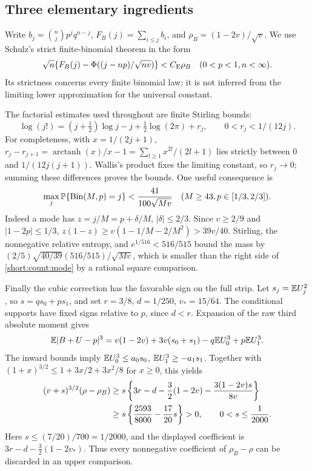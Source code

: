 \subsection{Three elementary ingredients}
\label{short:count:prelim}

Write $b_j=\binom njp^jq^{n-j}$, $F_B(j)=\sum_{i\le j}b_i$, and
$\rho_B=(1-2v)/\sqrt v$. We use Schulz's strict finite-binomial theorem
\cite[Theorem~1]{Schulz2016} in the form
\begin{equation}\label{short:count:binomial}
 \sqrt n\{F_B(j)-\Phi((j-np)/\sqrt{nv})\}<C_{\mathrm E}\rho_B
 \quad(0<p<1, n<\infty).
\end{equation}
Its strictness concerns every finite binomial law; it is not inferred
from the limiting lower approximation for the universal constant.

The factorial estimates used throughout are finite Stirling bounds:
\[
 \log(j!)=(j+\tfrac12)\log j-j+\tfrac12\log(2\pi)+r_j,
 \qquad 0<r_j<1/(12j).
\]
For completeness, with $x=1/(2j+1)$,
$r_j-r_{j+1}=\operatorname{arctanh}(x)/x-1
=\sum_{l\ge1}x^{2l}/(2l+1)$ lies strictly between $0$ and
$1/(12j(j+1))$. Wallis's product fixes the limiting constant, so
$r_j\to0$; summing these differences proves the bounds.
One useful consequence is
\begin{equation}\label{short:count:mode}
 \max_j\mathbb P\{\operatorname{Bin}(M,p)=j\}
 <\frac{41}{100\sqrt{Mv}}\quad
 (M\ge43, p\in[1/3,2/3]).
\end{equation}
Indeed a mode has $z=j/M=p+\delta/M$, $|\delta|\le2/3$.
Since $v\ge2/9$ and $|1-2p|\le1/3$,
$z(1-z)\ge v(1-1/M-2/M^2)>39v/40$.
Stirling, the nonnegative relative entropy, and
$e^{1/516}<516/515$ bound the mass by
$(2/5)\sqrt{40/39}(516/515)/\sqrt{Mv}$, which is smaller than
the right side of \eqref{short:count:mode} by a rational square comparison.

Finally the cubic correction has the favorable sign on the full strip.
Let $s_j=\mathbb E U_j^2$, so $s=qs_0+ps_1$, and set
$r=3/8$, $d=1/250$, $v_*=15/64$.
The conditional supports have fixed signs relative to $p$, since $d<r$.
Expansion of the raw third absolute moment gives
\[
 \mathbb E|B+U-p|^3
 =v(1-2v)+3v(s_0+s_1)-q\mathbb E U_0^3+p\mathbb E U_1^3.
\]
The inward bounds imply
$\mathbb E U_0^3\le a_0s_0$, $\mathbb E U_1^3\ge-a_1s_1$.
Together with $(1+x)^{3/2}\le1+3x/2+3x^2/8$ for $x\ge0$, this yields
\begin{align}
 (v+s)^{3/2}(\rho-\rho_B)
 &\ge s\left\{3r-d-\frac32(1-2v)
                         -\frac{3(1-2v)s}{8v}\right\}\notag\\
 &\ge s\left\{\frac{2593}{8000}-\frac{17}{20}s\right\}>0,
 \qquad 0<s\le\frac1{2000}.
 \label{short:count:cubic}
\end{align}
Here $s\le(7/20)/700=1/2000$, and the displayed coefficient is
$3r-d-\tfrac32(1-2v_*)$. Thus every nonnegative coefficient of
$\rho_B-\rho$ can be discarded in an upper comparison.

